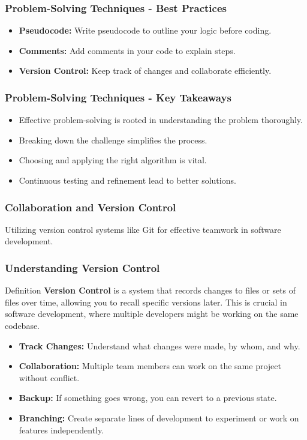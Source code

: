 \documentclass{beamer}
\begin{document}
\begin{frame}
    \frametitle{Problem-Solving Techniques - Best Practices}
    \begin{itemize}
        \item \textbf{Pseudocode:} Write pseudocode to outline your logic before coding.
        \item \textbf{Comments:} Add comments in your code to explain steps.
        \item \textbf{Version Control:} Keep track of changes and collaborate efficiently.
    \end{itemize}
\end{frame}

\begin{frame}
    \frametitle{Problem-Solving Techniques - Key Takeaways}
    \begin{itemize}
        \item Effective problem-solving is rooted in understanding the problem thoroughly.
        \item Breaking down the challenge simplifies the process.
        \item Choosing and applying the right algorithm is vital.
        \item Continuous testing and refinement lead to better solutions.
    \end{itemize}
\end{frame}

\begin{frame}[fragile]
    \frametitle{Collaboration and Version Control}
    Utilizing version control systems like Git for effective teamwork in software development.
\end{frame}

\begin{frame}[fragile]
    \frametitle{Understanding Version Control}
    \begin{block}{Definition}
        \textbf{Version Control} is a system that records changes to files or sets of files over time, allowing you to recall specific versions later. This is crucial in software development, where multiple developers might be working on the same codebase.
    \end{block}
    
    \begin{itemize}
        \item \textbf{Track Changes:} Understand what changes were made, by whom, and why.
        \item \textbf{Collaboration:} Multiple team members can work on the same project without conflict.
        \item \textbf{Backup:} If something goes wrong, you can revert to a previous state.
        \item \textbf{Branching:} Create separate lines of development to experiment or work on features independently.
    \end{itemize}
\end{frame}
\end{document}
